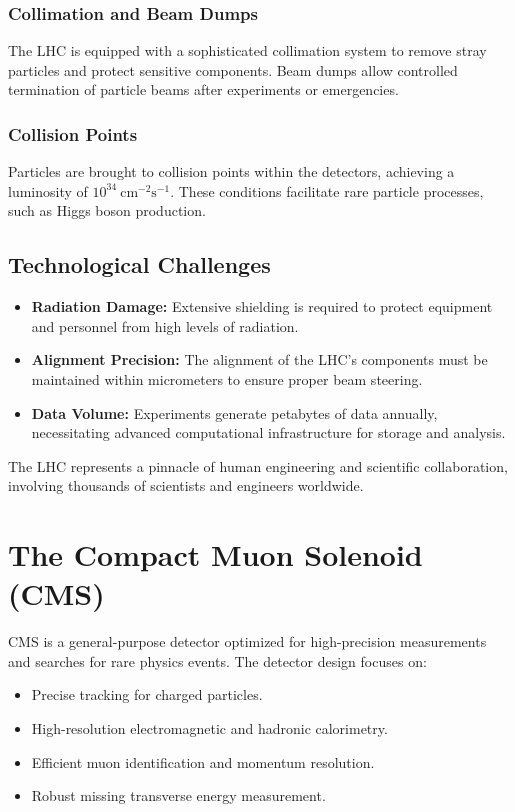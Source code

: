 \subsubsection{Collimation and Beam Dumps}
The LHC is equipped with a sophisticated collimation system to remove stray particles and protect sensitive components. Beam dumps allow controlled termination of particle beams after experiments or emergencies.

\subsubsection{Collision Points}
Particles are brought to collision points within the detectors, achieving a luminosity of $10^{34}~\mathrm{cm^{-2}s^{-1}}$. These conditions facilitate rare particle processes, such as Higgs boson production.

\subsection{Technological Challenges}
\begin{itemize}
    \item \textbf{Radiation Damage:} Extensive shielding is required to protect equipment and personnel from high levels of radiation.
    \item \textbf{Alignment Precision:} The alignment of the LHC's components must be maintained within micrometers to ensure proper beam steering.
    \item \textbf{Data Volume:} Experiments generate petabytes of data annually, necessitating advanced computational infrastructure for storage and analysis.
\end{itemize}

The LHC represents a pinnacle of human engineering and scientific collaboration, involving thousands of scientists and engineers worldwide.

\section{The Compact Muon Solenoid (CMS)}
CMS is a general-purpose detector optimized for high-precision measurements and searches for rare physics events. The detector design focuses on:
\begin{itemize}
    \item Precise tracking for charged particles.
    \item High-resolution electromagnetic and hadronic calorimetry.
    \item Efficient muon identification and momentum resolution.
    \item Robust missing transverse energy measurement.
\end{itemize}

